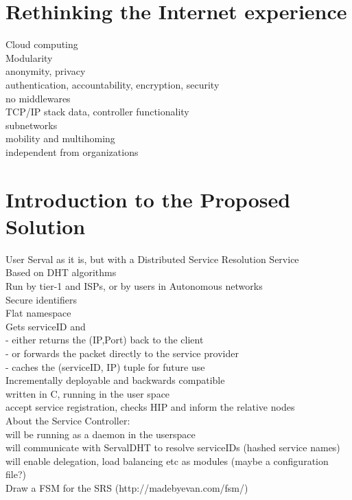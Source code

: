 \documentclass[12pt,a4paper,oneside]{article}
\begin{document}
\newpage
\section{Rethinking the Internet experience}
Cloud computing
\\Modularity
\\anonymity, privacy
\\authentication, accountability, encryption, security
\\no middlewares
\\TCP/IP stack data, controller functionality
\\subnetworks
\\mobility and multihoming
\\independent from organizations


\newpage
\section{Introduction to the Proposed Solution}
User Serval as it is, but with a Distributed Service Resolution Service
\\Based on DHT algorithms
\\Run by tier-1 and ISPs, or by users in Autonomous networks
\\Secure identifiers
\\Flat namespace
\\Gets serviceID and
\\- either returns the (IP,Port) back to the client
\\- or forwards the packet directly to the service provider
\\- caches the (serviceID, IP) tuple for future use
\\Incrementally deployable and backwards compatible
\\written in C, running in the user space
\\accept service registration, checks HIP and inform the relative nodes
\\About the Service Controller:
\\will be running as a daemon in the userspace
\\will communicate with ServalDHT to resolve serviceIDs (hashed service names)
\\will enable delegation, load balancing etc as modules (maybe a configuration file?)
\\Draw a FSM for the SRS (http://madebyevan.com/fsm/)
\end{document}
